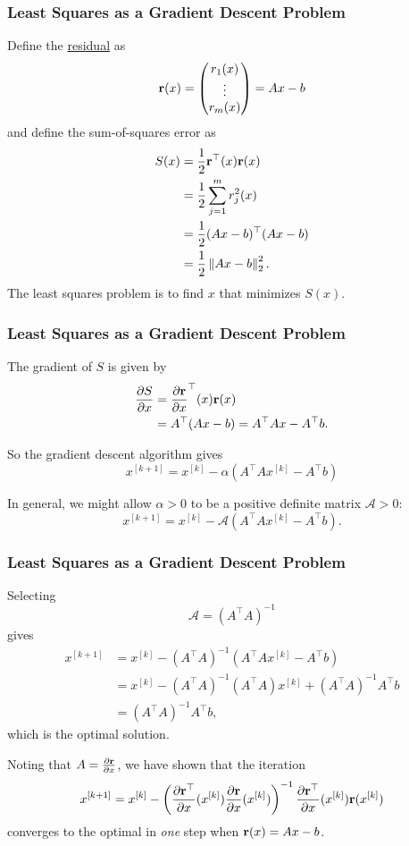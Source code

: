 \documentclass{beamer}
\begin{document}
\begin{frame}\frametitle{Least Squares as a Gradient Descent Problem}
	Define the \underline{residual} as
	\[
		\mathbf{r}(x) = \begin{pmatrix} r_1(x) \\ \vdots \\ r_m(x) \end{pmatrix} = Ax-b
	\]	
	and define the sum-of-squares error as
	\begin{align*}
	S(x) &= \frac{1}{2}\mathbf{r}^\top(x)\mathbf{r}(x) \\
		 &= \frac{1}{2}\sum_{j=1}^m r_j^2(x) \\
		 &= \frac{1}{2}(Ax-b)^\top (Ax-b) \\
		 &= \frac{1}{2}\left\|Ax-b\right\|_2^2.
	\end{align*}
	The least squares problem is to find $x$ that minimizes $S(x)$.
\end{frame}

\begin{frame}\frametitle{Least Squares as a Gradient Descent Problem}
	The gradient of $S$ is given by
	\begin{align*}
		\frac{\partial S}{\partial x} 
			&= \frac{\partial \mathbf{r}}{\partial x}^\top(x) \mathbf{r}(x) \\
			&= A^\top (Ax-b) = A^\top A x - A^\top b.
	\end{align*}
	
	So the gradient descent algorithm gives
	\[
	x^{[k+1]} = x^{[k]} - \alpha \left(A^\top A x^{[k]} - A^\top b\right)
	\]
	
	In general, we might allow $\alpha>0$ to be a positive definite matrix $\mathscr{A}>0$:
	\[
	x^{[k+1]} = x^{[k]} - \mathscr{A} \left(A^\top A x^{[k]} - A^\top b\right).
	\]	
	
\end{frame}

\begin{frame}\frametitle{Least Squares as a Gradient Descent Problem}
	Selecting 
	\[
		\mathscr{A} = (A^\top A)^{-1}
	\]	
	gives
	\begin{align*}
	x^{[k+1]} 
		&= x^{[k]} - (A^\top A)^{-1} \left(A^\top A x^{[k]} - A^\top b\right) \\
		&= x^{[k]} - (A^\top A)^{-1} (A^\top A) x^{[k]} + (A^\top A)^{-1} A^\top b \\
		&= (A^\top A)^{-1} A^\top b,
	\end{align*}
	which is the optimal solution.  
	
	Noting that $A = \frac{\partial \mathbf{r}}{\partial x}$, we have shown that the iteration
	\[
	x^{[k+1]} = x^{[k]} - \left(\frac{\partial \mathbf{r}^\top}{\partial x}(x^{[k]}) \frac{\partial \mathbf{r}}{\partial x}(x^{[k]})\right)^{-1} \frac{\partial \mathbf{r}^\top}{\partial x}(x^{[k]}) \mathbf{r}(x^{[k]})
	\]
	converges to the optimal in {\em one} step when $\mathbf{r}(x) = Ax-b$.
\end{frame}
\end{document}
